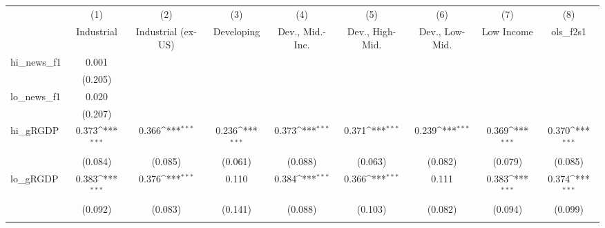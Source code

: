 {
\def\sym#1{\ifmmode^{#1}\else\(^{#1}\)\fi}
\begin{tabular}{l*{8}{c}}
\toprule
            &\multicolumn{1}{c}{(1)}&\multicolumn{1}{c}{(2)}&\multicolumn{1}{c}{(3)}&\multicolumn{1}{c}{(4)}&\multicolumn{1}{c}{(5)}&\multicolumn{1}{c}{(6)}&\multicolumn{1}{c}{(7)}&\multicolumn{1}{c}{(8)}\\
            &\multicolumn{1}{c}{Industrial}&\multicolumn{1}{c}{Industrial (ex-US)}&\multicolumn{1}{c}{Developing}&\multicolumn{1}{c}{Dev., Mid.-Inc.}&\multicolumn{1}{c}{Dev., High-Mid.}&\multicolumn{1}{c}{Dev., Low-Mid.}&\multicolumn{1}{c}{Low Income}&\multicolumn{1}{c}{ols\_f2s1}\\
\midrule
hi\_news\_f1  &       0.001         &                     &                     &                     &                     &                     &                     &                     \\
            &     (0.205)         &                     &                     &                     &                     &                     &                     &                     \\
\addlinespace
lo\_news\_f1  &       0.020         &                     &                     &                     &                     &                     &                     &                     \\
            &     (0.207)         &                     &                     &                     &                     &                     &                     &                     \\
\addlinespace
hi\_gRGDP    &       0.373\sym{***}&       0.366\sym{***}&       0.236\sym{***}&       0.373\sym{***}&       0.371\sym{***}&       0.239\sym{***}&       0.369\sym{***}&       0.370\sym{***}\\
            &     (0.084)         &     (0.085)         &     (0.061)         &     (0.088)         &     (0.063)         &     (0.082)         &     (0.079)         &     (0.085)         \\
\addlinespace
lo\_gRGDP    &       0.383\sym{***}&       0.376\sym{***}&       0.110         &       0.384\sym{***}&       0.366\sym{***}&       0.111         &       0.383\sym{***}&       0.374\sym{***}\\
            &     (0.092)         &     (0.083)         &     (0.141)         &     (0.088)         &     (0.103)         &     (0.082)         &     (0.094)         &     (0.099)         \\
\addlinespace

\end{tabular}}
